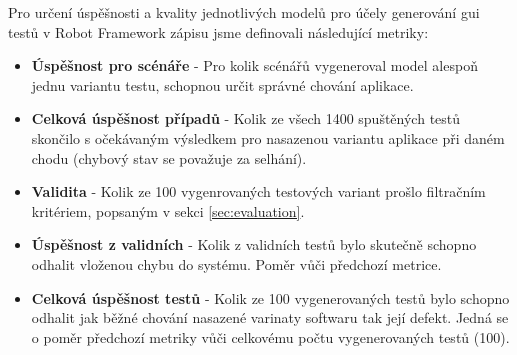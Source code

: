 \documentclass[czech, ma, kiv, he, iso690numb, pdf, viewonly]{fasthesis}
\begin{document}
        Pro určení úspěšnosti a kvality jednotlivých modelů pro účely generování \Acrshort{gui} testů v Robot Framework zápisu jsme definovali následující metriky: 
        \begin{itemize}
            \item \textbf{Úspěšnost pro scénáře} - Pro kolik scénářů vygeneroval model alespoň jednu variantu testu, schopnou určit správné chování aplikace.
            \item \textbf{Celková úspěšnost případů} - Kolik ze všech 1400 spuštěných testů skončilo s očekávaným výsledkem pro nasazenou variantu aplikace při daném chodu (chybový stav se považuje za selhání).
            \item \textbf{Validita} - Kolik ze 100 vygenrovaných testových variant prošlo filtračním kritériem, popsaným v sekci \ref{sec:evaluation}. 
            \item \textbf{Úspěšnost z validních} - Kolik z validních testů bylo skutečně schopno odhalit vloženou chybu do systému. Poměr vůči předchozí metrice.
            \item \textbf{Celková úspěšnost testů} - Kolik ze 100 vygenerovaných testů bylo schopno odhalit jak běžné chování nasazené varinaty softwaru tak její defekt. Jedná se o poměr předchozí metriky vůči celkovému počtu vygenerovaných testů (100).
        \end{itemize}
\end{document}
